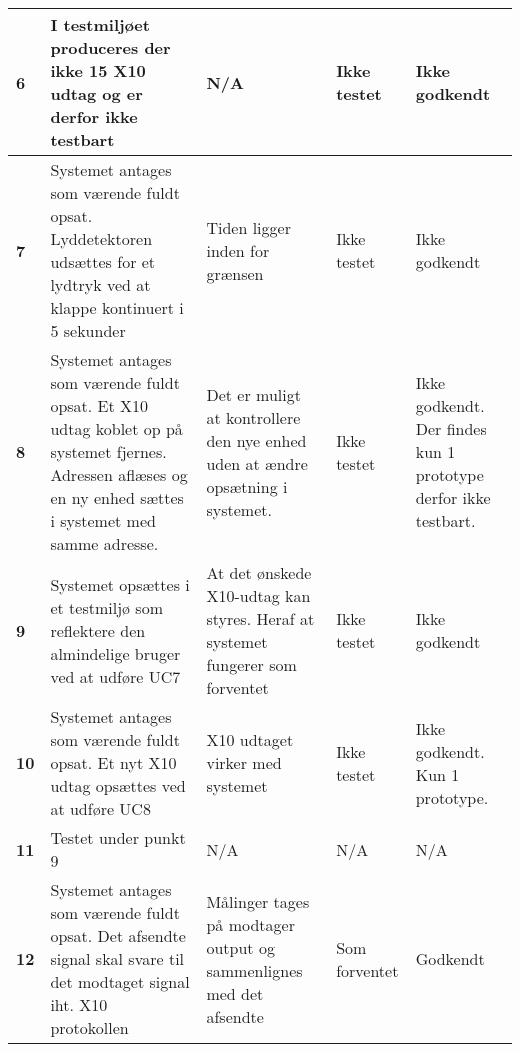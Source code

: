 \begin{center}
\begin{longtable}{|p{}|p{}|p{}|p{}|p{}|}
\textbf{6} &
I testmiljøet produceres der ikke 15 X10 udtag og er derfor ikke testbart &
N/A  
&Ikke \newline testet
&Ikke \newline godkendt
 \\\hline

\textbf{7} &
Systemet antages som værende fuldt opsat.\newline
Lyddetektoren udsættes for et lydtryk ved at klappe kontinuert i 5 sekunder &
Tiden ligger inden for grænsen
&Ikke \newline testet
&Ikke \newline godkendt
 \\\hline

\textbf{8} &
Systemet antages som værende fuldt opsat.\newline
Et X10 udtag koblet op på systemet fjernes. Adressen aflæses og en ny enhed sættes i systemet med samme adresse.&
Det er muligt at kontrollere den nye enhed uden at ændre opsætning i systemet.
&Ikke \newline testet
&Ikke \newline godkendt. \newline Der findes kun 1 prototype derfor ikke testbart.
 \\\hline

\textbf{9} &
Systemet opsættes i et testmiljø som reflektere den almindelige bruger ved at udføre UC7&
At det ønskede X10-udtag kan styres. Heraf at systemet fungerer som forventet
&Ikke \newline testet
&Ikke \newline godkendt 
 \\\hline

\textbf{10} &
Systemet antages som værende fuldt opsat.\newline
Et nyt X10 udtag opsættes ved at udføre UC8 &
X10 udtaget virker med systemet
&Ikke \newline testet
&Ikke \newline godkendt. \newline Kun 1 prototype.
 \\\hline

\textbf{11} &
Testet under punkt 9&
N/A &
N/A &
N/A \\\hline

\textbf{12} &
Systemet antages som værende fuldt opsat.\newline
Det afsendte signal skal svare til det modtaget signal iht. X10 protokollen&
Målinger tages på modtager output og sammenlignes med det afsendte
&Som \newline forventet
&Godkendt
 \\\hline


\end{longtable}
\end{center}
